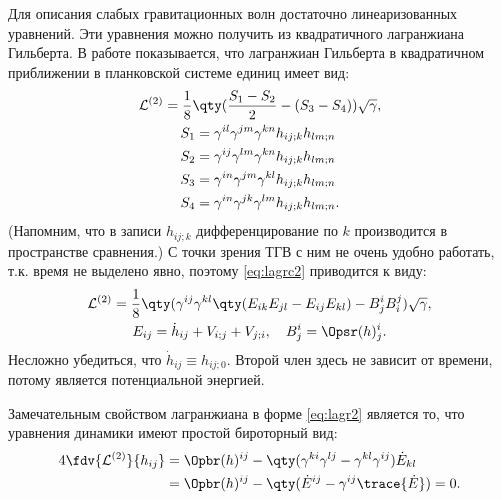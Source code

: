 \documentclass[\docroot/reports/draft/report.tex]{subfiles}
\begin{document}
    Для описания слабых гравитационных волн достаточно линеаризованных уравнений. Эти уравнения можно получить из квадратичного лагранжиана Гильберта. В работе \cite{burlankov_grav_waves} показывается, что лагранжиан Гильберта в квадратичном приближении в планковской системе единиц имеет вид:
    \begin{equation}\label{eq:lagrc2}
        \begin{gathered}
            \mathcal{L}^{(2)} = \frac{1}{8} \qty(
                \frac{S_1 - S_2}{2} - (S_3 - S_4)
            ) \sqrt{\gamma}, \\
            \begin{aligned}
                S_1 &= \gamma^{il}\gamma^{jm}\gamma^{kn} h_{ij;k} h_{lm;n} \\
                S_2 &= \gamma^{ij}\gamma^{lm}\gamma^{kn} h_{ij;k} h_{lm;n} \\
                S_3 &= \gamma^{in}\gamma^{jm}\gamma^{kl} h_{ij;k} h_{lm;n} \\
                S_4 &= \gamma^{in}\gamma^{jk}\gamma^{lm} h_{ij;k} h_{lm;n} .
            \end{aligned}
        \end{gathered}
    \end{equation}
    (Напомним, что в записи $h_{ij;k}$ дифференцирование по $k$ производится в пространстве сравнения.) С точки зрения ТГВ с ним не очень удобно работать, т.к. время не выделено явно, поэтому \autoref{eq:lagrc2} приводится к виду:
    \begin{equation}\label{eq:lagr2}
        \begin{gathered}
            \mathcal{L}^{(2)} = \frac{1}{8} \qty(
                \gamma^{ij} \gamma^{kl} \qty(
                    E_{ik} E_{jl} - E_{ij} E_{kl}
                ) - B^i_j B^j_i
            ) \sqrt{\gamma}, \\
            E_{ij} = \dot{h}_{ij} + V_{i;j} + V_{j;i}, \quad
            B^i_j = \Opsr(h)^i_j .
        \end{gathered}
    \end{equation}
    Несложно убедиться, что $\dot{h}_{ij} \equiv h_{ij;0}$. Второй член здесь не зависит от времени, потому является потенциальной энергией.

    Замечательным свойством лагранжиана в форме \autoref{eq:lagr2} является то, что уравнения динамики имеют простой бироторный вид:
    \begin{equation}\begin{aligned}\label{eq:lagr2var}
        4\fdv{\mathcal{L}^{(2)}}{h_{ij}} &= \Opbr(h)^{ij} -
        \qty(\gamma^{ki}\gamma^{lj} - \gamma^{kl}\gamma^{ij}) \dot{E}_{kl} \\
                   &= \Opbr(h)^{ij} - \qty(\dot{E}^{ij} - \gamma^{ij} \trace{\dot{E}}) = 0.
    \end{aligned}\end{equation}
\end{document}
